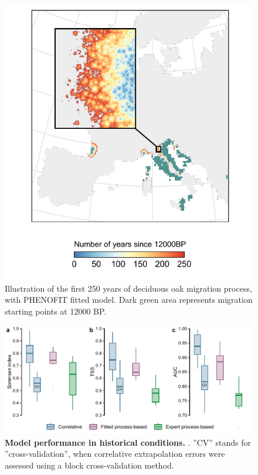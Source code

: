 \documentclass[pdflatex, sn-nature, oneside]{sn-jnl}%
\begin{document}
\begin{figure}
\hspace*{-0.4in}
\centering
\includegraphics{migration_process-1.pdf}
\caption{Illustration of the first 250 years of deciduous oak migration process, with PHENOFIT fitted model. Dark green area represents migration starting points at 12000 BP.}
\end{figure}

\begin{figure}
\hspace*{-0.4in}
\centering
\includegraphics{historical_perf-1.pdf}
\caption{\textbf{Model performance in historical conditions.} . ”CV” stands for ”cross-validation”, when
correlative extrapolation errors were assessed using a block cross-validation method.}
\end{figure}
\end{document}
